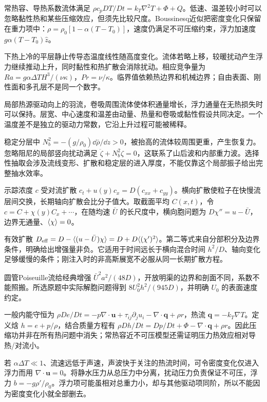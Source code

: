 常热容、导热系数流体满足 $\rho c_pDT/Dt=k_T\nabla^2T+\Phi+Q$。低速、温差较小时可以忽略黏性热和某些压缩效应，但须先比较尺度。Boussinesq近似把密度变化只保留在重力项中：$\rho=\rho_0[1-\alpha(T-T_0)]$，速度仍满足不可压缩约束，浮力加速度 $g\alpha(T-T_0)\hat z$。

下热上冷的平层静止传导态温度线性随高度变化。流体若略上移，较暖扰动产生浮力继续推动上升，同时黏性和热扩散会消除扰动。相应竞争量为 $Ra=g\alpha\Delta T H^3/(\nu\kappa)$，$Pr=\nu/\kappa$。临界值依赖热边界和机械边界；自由表面、刚性面和多孔层不是同一个数字。

局部热源驱动向上的羽流，卷吸周围流体使体积通量增长，浮力通量在无热损失时可以保持。层宽、中心速度和温差由动量、热量和卷吸或黏性假设共同决定。一个温度差不是独立的驱动力常数，它沿上升过程可能被稀释。

稳定分层中 $N_b^2=-(g/\rho_0)\dd\bar\rho/\dd z>0$，被抬高的流体较周围更重，产生恢复力。忽略阻尼的局部竖向扰动满足 $\ddot\zeta+N_b^2\zeta=0$，这联系了山后波和内部重力波。选择性抽取会涉及流线变形、扩散和稳定层的进入厚度，不能仅靠这个局部振子给出完整抽水效率。

示踪浓度 $c$ 受对流扩散 $c_t+u(y)c_x=D(c_{xx}+c_{yy})$。横向扩散使粒子在快慢流层间交换，长期轴向扩散会比分子值大。取截面平均 $C(x,t)$，令 $c=C+\chi(y)C_x+\cdots$，在随均速 $\bar U$ 的长尺度中，横向胞问题为 $D\chi''=u-\bar U$，边界无通量、$\langle \chi\rangle=0$。

有效扩散 $D_{\rm eff}=D-\langle (u-\bar U)\chi\rangle=D+D\langle (\chi')^2\rangle$。第二等式来自分部积分及边界条件，明确给出增强量非负。它适用于时间远长于横向混合时间 $h^2/D$、轴向变化足够缓慢的条件；刚注入时的非高斯展宽不必服从同一长期扩散方程。

圆管Poiseuille流给经典增强 $\bar U^2a^2/(48D)$，开放明渠的边界和剖面不同，系数不能照搬。所选原题中实际解胞问题得到 $8U_0^2h^2/(945D)$，并明确 $U_0$ 的表面速度约定。

一般内能守恒为 $\rho De/Dt=-p\nabla\cdot\mathbf u+\tau_{ij}\partial_j u_i-\nabla\cdot\mathbf q+\rho r$，热流 $\mathbf q=-k_T\nabla T$。定义焓 $h=e+p/\rho$，结合质量方程有 $\rho Dh/Dt=Dp/Dt+\Phi-\nabla\cdot\mathbf q+\rho r$。因此压缩功并非在所有热问题中消失；常热容近不可压模型还需证明压力热效应相对导热/对流小。

若 $\alpha\Delta T\ll1$、流速远低于声速，声波快于关注的热流时间，可令密度变化仅进入浮力而用 $\nabla\cdot\mathbf u=0$。将静水压力从总压力中分离，扰动压力负责保证不可压，浮力 $b=-g\rho'/\rho_0$。浮力项可能虽相对总重力小，却与其他驱动项同阶，所以不能因为密度变化小就全部删去。

